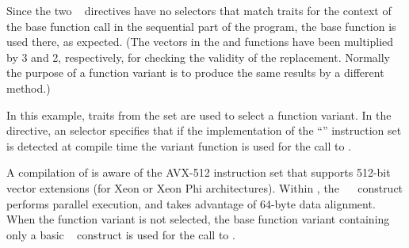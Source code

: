 Since the two ~ directives have no selectors that match traits for the context
of the base function call in the sequential part of the program, the base  function is used there, 
as expected.
(The vectors in the  and  functions have been multiplied
by 3 and 2, respectively, for checking the validity of the replacement. Normally
the purpose of a function variant is to produce the same results by a different method.)


{}




In this example, traits from the  set are used to select a function variant.
In the ~ directive, an  selector
specifies that if the implementation of the ``'' 
instruction set is detected at compile time the 
variant function is used for the call to .  

A compilation of  is aware of
the AVX-512 instruction set that supports 512-bit vector extensions (for Xeon or Xeon Phi architectures). 
Within , the ~~ construct performs parallel execution, and
takes advantage of 64-byte data alignment. 
When the  function variant is not selected, the base  function variant
containing only a basic ~ construct is used for the call to .


{}


